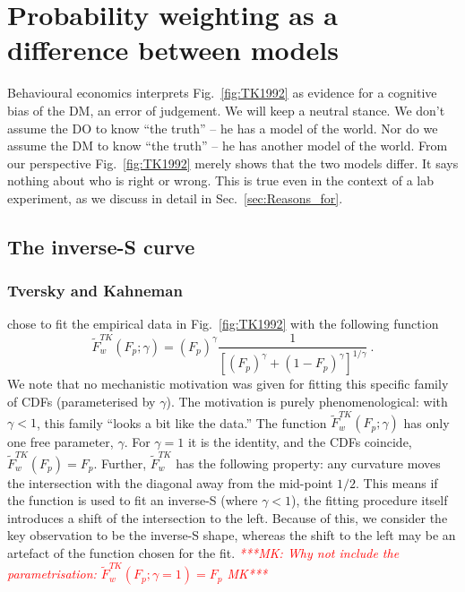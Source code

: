 \documentclass[a4paper, 12pt]{article}
\newcommand{\elabel}[1]{\label{eq:#1}}
\newcommand{\Eref}[1]{Equation~(\ref{eq:#1})}
\newcommand{\fref}[1]{Fig.~\ref{fig:#1}}
\newcommand{\seclabel}[1]{\label{sec:#1}}
\newcommand{\secref}[1]{Sec.~\ref{sec:#1}}
\newcommand{\be}{\begin{equation}}
\newcommand{\ee}{\end{equation}}
\newcommand{\MK}[1]{\textcolor{red}{\textit{***MK: #1 MK***}}}
\newcommand{\OP}[1]{{\it ***OP: #1 OP***}}
\begin{document}


\section{Probability weighting as a difference between models} \seclabel{ModelDiff}

Behavioural economics interprets \fref{TK1992} as evidence for a cognitive bias of the DM, an error of judgement. We will keep a neutral stance. We don't assume the DO to know ``the truth'' -- he has a model of the world. Nor do we assume the DM to know ``the truth'' -- he has another model of the world. From our perspective \fref{TK1992} merely shows that the two models differ. It says nothing about who is right or wrong. This is true even in the context of a lab experiment, as we discuss in detail in \secref{Reasons_for}.

\subsection{The inverse-S curve\seclabel{The_inverse}}
\subsubsection{Tversky and Kahneman}
\citet{TverskyKahneman1992} chose to fit the empirical data in \fref{TK1992} with the following function
% 
\be
\elabel{correspondence}
\tilde{F}^{TK}_w\left(F_p; \gamma\right) = \left(F_p\right)^\gamma \frac{1}{\left[\left(F_p\right)^\gamma+\left(1-F_p\right)^\gamma\right]^{1/\gamma}} ~.
\ee
We note that no mechanistic motivation was given for fitting this specific family of CDFs (parameterised by $\gamma$). The motivation is purely phenomenological: with $\gamma<1$, this family ``looks a bit like the data.''
% 
The function $\tilde{F}^{TK}_w\left(F_p; \gamma \right)$ has only one free parameter, $\gamma$. For $\gamma=1$ it is the identity, and the CDFs coincide, $\tilde{F}^{TK}_w\left(F_p\right)=F_p$. Further, $\tilde{F}^{TK}_w$ has the following property: any curvature moves the intersection with the diagonal away from the mid-point $1/2$. This means if the function is used to fit an inverse-S (where $\gamma<1$), the fitting procedure itself introduces a shift of the intersection to the left. Because of this, we consider the key observation to be the inverse-S shape, whereas the shift to the left may be an artefact of the function chosen for the fit. 
\MK{Why not include the parametrisation: $\tilde{F}^{TK}_w\left(F_p; \gamma =1 \right) = F_p$}
\end{document}

